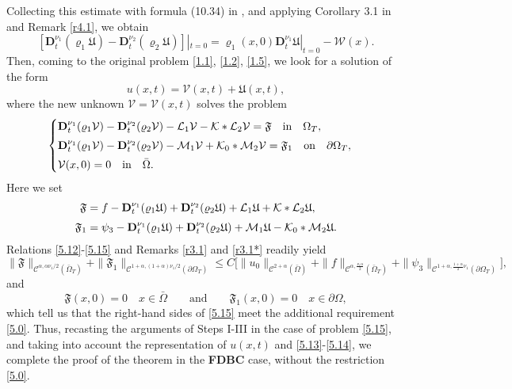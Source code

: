 \documentclass[reqno]{amsart}
\def\C {\mathcal{C}}
\theoremstyle{definition}
\numberwithin{equation}{section}
\begin{document}
Collecting this estimate with formula (10.34) in \cite{KPSV1},  and applying Corollary 3.1 in \cite{KPSV4} and Remark \ref{r4.1}, we obtain
\begin{equation}\label{5.14}
[\mathbf{D}_{t}^{\nu_{1}}(\varrho_{1}\mathfrak{U})-\mathbf{D}_{t}^{\nu_{2}}(\varrho_2 \mathfrak{U})]|_{t=0}=\varrho_{1}(x,0)\mathbf{D}_{t}^{\nu_{1}}\mathfrak{U}|_{t=0}-\mathcal{W}(x).
\end{equation}
Then, coming to the original problem \eqref{1.1}, \eqref{1.2}, \eqref{1.5}, we look for a solution of the form
\[
u(x,t)=\mathcal{V}(x,t)+\mathfrak{U}(x,t),
\]
where the new unknown $\mathcal{V}=\mathcal{V}(x,t)$ solves the problem
\begin{equation}\label{5.15}
\begin{cases}
\mathbf{D}_{t}^{\nu_{1}}(\varrho_1\mathcal{V})-\mathbf{D}_{t}^{\nu_2}(\varrho_2\mathcal{V})-\mathcal{L}_{1}\mathcal{V}-
\mathcal{K}*\mathcal{L}_{2}\mathcal{V}=\mathfrak{F}\quad\text{in}\quad\Omega_{T},\\
\noalign{\vskip1mm}
\mathbf{D}_{t}^{\nu_{1}}(\varrho_1\mathcal{V})-\mathbf{D}_{t}^{\nu_2}(\varrho_2\mathcal{V})-\mathcal{M}_{1}\mathcal{V}+
\mathcal{K}_{0}*\mathcal{M}_{2}\mathcal{V}=\mathfrak{F}_1\quad \text{on}\quad \partial\Omega_{T},\\
\noalign{\vskip1mm}
\mathcal{V}(x,0)=0\quad\text{in}\quad \bar{\Omega}.
\end{cases}
\end{equation}
Here we set
\begin{align*}
\mathfrak{F}&=f-\mathbf{D}_{t}^{\nu_{1}}(\varrho_1 \mathfrak{U})+\mathbf{D}_{t}^{\nu_2}(\varrho_2 \mathfrak{U})+\mathcal{L}_{1}\mathfrak{U}+
\mathcal{K}*\mathcal{L}_{2}\mathfrak{U},\\
\noalign{\vskip1mm}
\mathfrak{F}_{1}&=\psi_3-\mathbf{D}_{t}^{\nu_{1}}(\varrho_1 \mathfrak{U})+\mathbf{D}_{t}^{\nu_2}(\varrho_2 \mathfrak{U})+\mathcal{M}_{1}\mathfrak{U}-\mathcal{K}_{0}*\mathcal{M}_{2}\mathfrak{U}.
\end{align*}
Relations \eqref{5.12}-\eqref{5.15} and Remarks \ref{r3.1} and \ref{r3.1*} readily yield 
$$
\|\mathfrak{F}\|_{\C^{\alpha,\alpha\nu_{1}/2}(\bar{\Omega}_{T})}
+\|\mathfrak{F}_1\|_{\C^{1+\alpha,(1+\alpha)\nu_{1}/2}(\partial\Omega_{T})}
\leq
C\big[\|u_0\|_{\C^{2+\alpha}(\bar{\Omega})}+\|f\|_{\C^{\alpha,\frac{\nu_{1}\alpha}{2}}(\bar{\Omega}_{T})}
+
\|\psi_{3}\|_{\C^{1+\alpha,\frac{1+\alpha}{2}\nu_{1}}(\partial\Omega_{T})}
\big],
$$
and
$$
\mathfrak{F}(x,0)=0\quad x\in\bar{\Omega}\qquad\text{and}
\qquad\mathfrak{F}_{1}(x,0)=0\quad x\in\partial\Omega,
$$
which tell us that the right-hand sides of \eqref{5.15} meet the additional requirement \eqref{5.0}. Thus, recasting the arguments of Steps I-III in the case of problem \eqref{5.15}, and taking into account the representation of $u(x,t)$ and \eqref{5.13}-\eqref{5.14}, we complete the proof of the theorem in the \textbf{FDBC}
case, without the restriction \eqref{5.0}.
\end{document}
